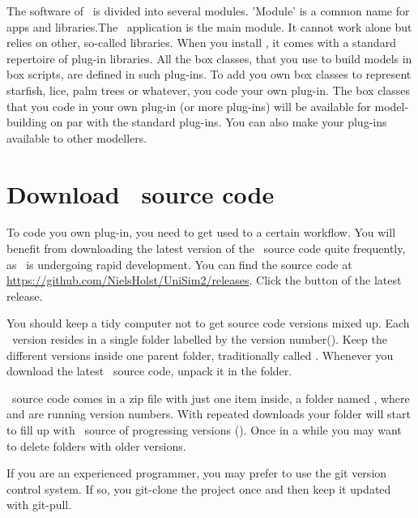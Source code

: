 The software of \US\ is divided into several modules. 'Module' is a common name for apps and libraries.The \US\ application is the main module. It cannot work alone but relies on other, so-called  libraries. When you install \US, it comes with a standard repertoire of plug-in libraries. All the box classes, that you use to build models in box scripts, are defined in such plug-ins. To add you own box classes to represent starfish, lice, palm trees or whatever, you code your own plug-in. The box classes that you code in your own plug-in (or more plug-ins) will be available for model-building on par with the standard plug-ins. You can also make your plug-ins available to other modellers.

\section{Download \protect\US\ source code}
To code you own plug-in, you need to get used to a certain workflow. You will benefit from downloading the latest version of the \US\ source code quite frequently, as \US\ is undergoing rapid development. You can find the source code at \url{https://github.com/NielsHolst/UniSim2/releases}. Click the  button of the latest release.

You should keep a tidy computer not to get source code versions mixed up. Each \US\ version resides in a single folder labelled by the version number(). Keep the different versions inside one parent folder, traditionally called . Whenever you download the latest \US\ source code, unpack it in the  folder.

\US\ source code comes in a zip file with just one item inside, a folder named , where  and  are running version numbers. With repeated downloads your  folder will start to fill up with \US\ source of progressing versions (). Once in a while you may want to delete folders with older versions.

If you are an experienced programmer, you may prefer to use the git version control system. If so, you git-clone the project once and then keep it updated with git-pull.

